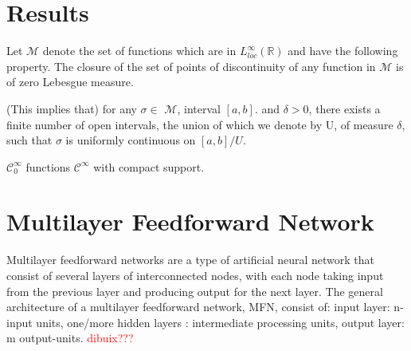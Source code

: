 \documentclass[../main.tex]{subfiles}
\begin{document}
\section{Results}
\begin{definition} Let $\mathcal{M}$ denote the set of functions which are in $L_{loc}^{\infty}(\mathbb{R})$ and have the following property. The closure of the set of points of discontinuity of any function in $\mathcal{M}$ is of zero Lebesgue measure. 
\begin{propo}
(This implies that) for any $\sigma \in$ $\mathcal{M}$, interval $[a,b] .$ and $\delta >0$, there exists a finite number of open intervals, the union of which we denote by U, of measure $\delta$, such that $\sigma$ is uniformly continuous on $[a,b]/U$. 
\end{propo}
\end{definition}

\begin{definition} 
	$ \mathcal{C}^\infty_0$ functions $\mathcal{C}^\infty$ with compact support.  
\end{definition}

\section{Multilayer Feedforward Network}
\noindent Multilayer feedforward networks are a type of artificial neural network that consist of several layers of interconnected nodes, with each node taking input from the previous layer and producing output for the next layer. The general architecture of a multilayer feedforward network, MFN, consist of: input layer: n-input units,  one/more hidden layers : intermediate processing units, output layer: m output-units.  \textcolor{red}{dibuix???}
\end{document}
